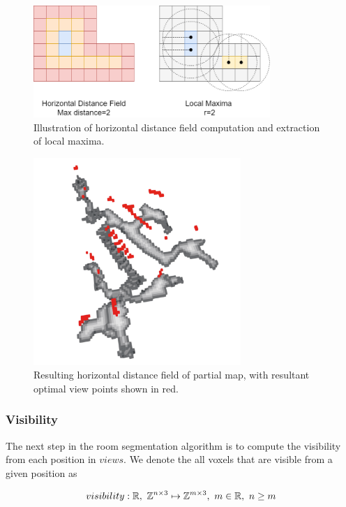 \begin{figure}[h]
    \centering
    \includegraphics*[width=0.8\textwidth]{./fig/hdf_simple.png}
    \caption{Illustration of horizontal distance field computation and extraction of local maxima.}
    \label{fig:hdf_simple}
\end{figure}

\begin{figure}[h]
    \centering
    \includegraphics*[width=0.7\textwidth]{./fig/horizontal_distance_field.png}
    \caption{Resulting horizontal distance field of partial map, with resultant optimal view points shown in red.}
    \label{fig:hdf}
\end{figure}

\subsubsection{Visibility}
The next step in the room segmentation algorithm is to compute the visibility from each position in \(views\). We denote the all voxels that are visible from a given position as 

\begin{equation}
    \label{eq:visibility}
    visibility: \mathbb{R},\ \voxelset \mapsto \mathbb{Z}^{m \times 3},\ m \in \mathbb{R},\ n \geq m
\end{equation}

